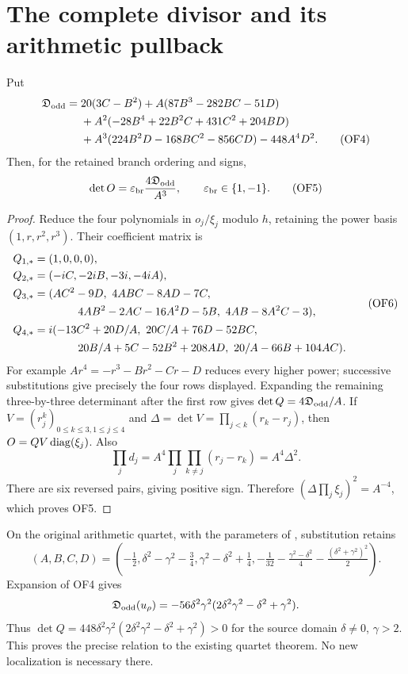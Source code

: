\section{The complete divisor and its arithmetic pullback}
\begin{sfrepairtheorem}
Put
\begin{align}
 \mathfrak D_{\rm odd}={}&20(3C-B^2)+A(87B^3-282BC-51D)\notag\\
 &+A^2(-28B^4+22B^2C+431C^2+204BD)\notag\\
 &+A^3(224B^2D-168BC^2-856CD)-448A^4D^2.
 \tag{OF4}
\end{align}
Then, for the retained branch ordering and signs,
\begin{equation}
 \det O=\varepsilon_{\rm br}\frac{4\mathfrak D_{\rm odd}}{A^3},\qquad
 \varepsilon_{\rm br}\in\{1,-1\}.\tag{OF5}
\end{equation}
\end{sfrepairtheorem}
\begin{proof}
Reduce the four polynomials in $o_j/\xi_j$ modulo $h$, retaining
the power basis $(1,r,r^2,r^3)$. Their coefficient matrix is
\begin{equation}
 \begin{aligned}
 Q_{1,*}&=(1,0,0,0),\\
 Q_{2,*}&=(-iC,-2iB,-3i,-4iA),\\
 Q_{3,*}&=(AC^2-9D,\ 4ABC-8AD-7C,\\
 &\hspace{14mm}4AB^2-2AC-16A^2D-5B,\ 4AB-8A^2C-3),\\
 Q_{4,*}&=i(-13C^2+20D/A,\ 20C/A+76D-52BC,\\
 &\hspace{14mm}20B/A+5C-52B^2+208AD,\ 20/A-66B+104AC).
 \end{aligned}\tag{OF6}
\end{equation}
For example $Ar^4=-r^3-Br^2-Cr-D$ reduces every higher power;
successive substitutions give precisely the four rows displayed.
Expanding the remaining three-by-three determinant after the first
row gives $\det Q=4\mathfrak D_{\rm odd}/A$. If
$V=(r_j^{k})_{0\le k\le3,1\le j\le4}$ and
$\Delta=\det V=\prod_{j<k}(r_k-r_j)$, then
$O=QV\operatorname{diag}(\xi_j)$. Also
\[
 \prod_jd_j=A^4\prod_j\prod_{k\ne j}(r_j-r_k)
 =A^4\Delta^2.
\]
There are six reversed pairs, giving positive sign. Therefore
$(\Delta\prod_j\xi_j)^2=A^{-4}$, which proves OF5.
\end{proof}

On the original arithmetic quartet, with the parameters of
\cite[GF20]{sfrepair:Fable}, substitution retains
\begin{equation}
 (A,B,C,D)=\left(-\tfrac12,\delta^2-\gamma^2-\tfrac34,
 \gamma^2-\delta^2+\tfrac14,
 -\tfrac1{32}-\tfrac{\gamma^2-\delta^2}{4}
 -\tfrac{(\delta^2+\gamma^2)^2}{2}\right).
 \tag{OF7}
\end{equation}
Expansion of OF4 gives
\[
 \mathfrak D_{\rm odd}(u_\rho)=-56\delta^2\gamma^2
                 (2\delta^2\gamma^2-\delta^2+\gamma^2).
\]
Thus $\det Q=448\delta^2\gamma^2
(2\delta^2\gamma^2-\delta^2+\gamma^2)>0$ for the source domain
$\delta\ne0$, $\gamma>2$. This proves the precise relation to the
existing quartet theorem. No new localization is necessary there.

